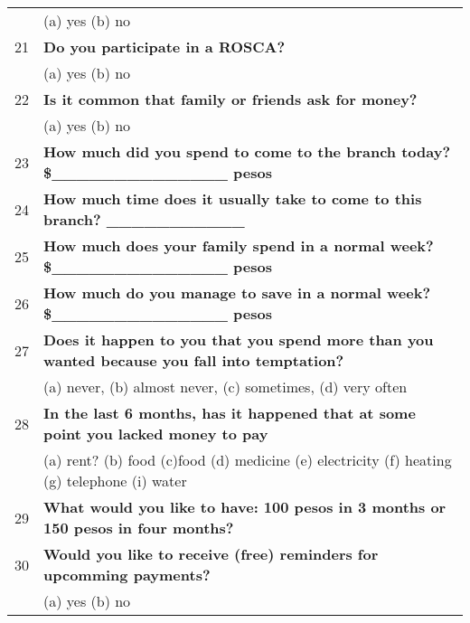 \begin{tabular}{cl}
      & (a) yes  (b) no \\
\rowcolor[rgb]{ .682,  .667,  .667} 21    & \textbf{Do you participate in a ROSCA?} \\
      & (a) yes  (b) no \\
\rowcolor[rgb]{ .682,  .667,  .667} 22    & \textbf{Is it common that family or friends ask for money?} \\
      & (a) yes  (b) no \\
\rowcolor[rgb]{ .682,  .667,  .667} 23    & \textbf{How much did you spend to come to the branch today?    \$\_\_\_\_\_\_\_\_\_\_\_\_\_\_ pesos} \\
\rowcolor[rgb]{ .682,  .667,  .667} 24    & \textbf{How much time does it usually take to come to this branch?    \_\_\_\_\_\_\_\_\_\_\_} \\
25    & \textbf{How much does your family spend in a normal week?   \$\_\_\_\_\_\_\_\_\_\_\_\_\_\_ pesos} \\
26    & \textbf{How much do you manage to save in a normal week?   \$\_\_\_\_\_\_\_\_\_\_\_\_\_\_ pesos} \\
\rowcolor[rgb]{ .682,  .667,  .667} 27    & \textbf{Does it happen to you that you spend more than you wanted because you fall into temptation?} \\
      & (a) never, (b) almost never, (c) sometimes, (d) very often \\
\rowcolor[rgb]{ .682,  .667,  .667} 28    & \textbf{In the last 6 months, has it happened that at some point you lacked money to pay} \\
      & (a) rent?    (b) food    (c)food   (d) medicine  (e) electricity   (f) heating   (g) telephone    (i) water \\
\rowcolor[rgb]{ .682,  .667,  .667} 29    & \textbf{What would you like to have: 100 pesos in 3 months or 150 pesos in four months?} \\
\rowcolor[rgb]{ .682,  .667,  .667} 30    & \textbf{Would you like to receive (free) reminders for upcomming payments?} \\
      & (a) yes  (b) no \\
\bottomrule
\end{tabular}%
